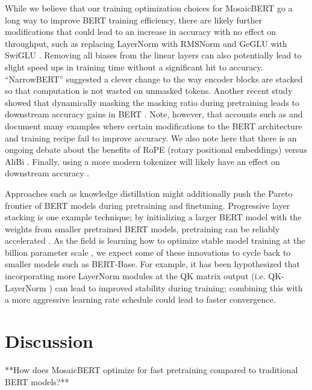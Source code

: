 \documentclass{article}
\begin{document}

While we believe that our training optimization choices for MosaicBERT go a long way to improve BERT training efficiency, there are likely further modifications that could lead to an increase in accuracy with no effect on throughput, such as replacing LayerNorm with RMSNorm \citep{zhang2019root} and GeGLU with SwiGLU \citep{shazeer2020glu,narang2021transformer}. Removing all biases from the linear layers can also potentially lead to slight speed ups in training time without a significant hit to accuracy. ``NarrowBERT'' \citep{li2023narrowbert} suggested a clever change to the way encoder blocks are stacked so that computation is not wasted on unmasked tokens. Another recent study showed that dynamically masking the masking ratio during pretraining leads to downstream accuracy gains in BERT \cite{ankner2023dynamic}.  Note, however, that accounts such as \citep{geiping2023cramming} and \citep{kaddour2023no} document many examples where certain modifications to the BERT architecture and training recipe fail to improve accuracy. We also note here that there is an ongoing debate about the benefits of RoPE (rotary positional embeddings) \citep{su2024roformer} versus AliBi \citep{press2021train}. Finally, using a more modern tokenizer will likely have an effect on downstream accuracy \citep{geiping2023cramming}.

Approaches such as knowledge distillation \citep{blakeney2022reduce} might additionally push the Pareto frontier of BERT models during pretraining and finetuning. Progressive layer stacking is one example technique; by initializing a larger BERT model with the weights from smaller pretrained BERT models, pretraining can be reliably accelerated \citep{gong2019efficient,kaddour2023no}. As the field is learning how to optimize stable model training at the billion parameter scale \citep{chowdhery2022palm,dehghani2023scaling}, we expect some of these innovations to cycle back to smaller models such as BERT-Base. For example, it has been hypothesized that incorporating more LayerNorm modules at the QK matrix output (i.e. QK-LayerNorm \citep{henry2020query}) can lead to improved stability during training; combining this with a more aggressive learning rate schedule could lead to faster convergence.

\section{Discussion}
**How does MosaicBERT optimize for fast pretraining compared to traditional BERT models?**
\end{document}
